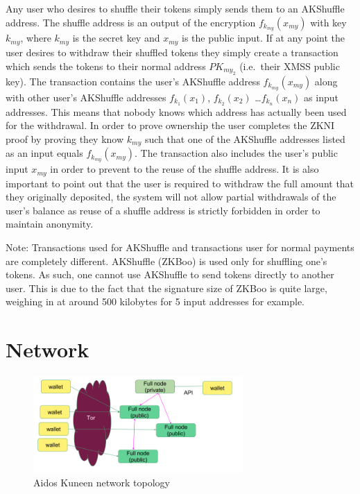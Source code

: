 \documentclass[a4paper,10pt,twocolumn]{article}
\begin{document}
Any user who desires to shuffle their tokens simply sends them to an AKShuffle address.
The shuffle address is an output of the encryption \( f_{k_{my}}(x_{my}) \) with key \( k_{my} \),  
where \(k_{my}\) is the secret key  and \(x_{my}\) is the public input.
If at any point the user desires to withdraw their shuffled tokens they simply create a transaction which sends the tokens to their 
normal address \(PK_{my_2}\) (i.e.\ their XMSS public key).
The transaction contains the user's AKShuffle address \( f_{k_{my}}(x_{my}) \) along with other user's AKShuffle addresses 
\( f_{k_{1}}(x_{1}) \), \( f_{k_{2}}(x_{2}) \) \dots \( f_{k_{n}}(x_{n}) \) as input addresses. 
This means that nobody knows which address has actually been used for the withdrawal. 
In order to prove ownership the user completes the ZKNI proof by proving they know \( k_{my} \) such that one of the AKShuffle 
addresses listed as an input equals \( f_{k_{my}}(x_{my}) \). 
The transaction also includes the user's public input \( x_{my} \) in order to prevent to the reuse of the shuffle address. It is also 
important to point out that the user is required to withdraw the full amount that they originally deposited, 
the system will not allow partial withdrawals of the user's balance as reuse of a shuffle address is strictly forbidden in order to maintain anonymity.

Note: Transactions used for AKShuffle and transactions user for normal payments are completely different. AKShuffle (ZKBoo) is used 
only for shuffling one's tokens. As such, one cannot use AKShuffle to send tokens directly to another user. This is due to the fact 
that the signature size of ZKBoo is quite large, weighing in at around 500 kilobytes for 5 input addresses for example.

\section{Network}
\label{sec:network}

\begin{figure}[ht]
	\begin{center}
	\includegraphics[width=80mm]{network.png}
	  \caption{Aidos Kuneen network topology}
    \label{fig:network}
	\end{center}
 \end{figure}
\end{document}
